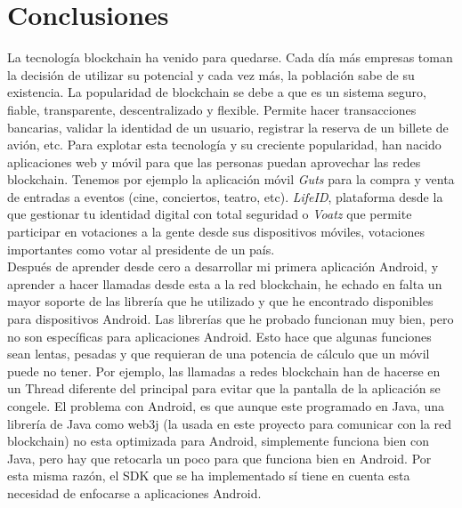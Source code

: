 \chapter{Conclusiones}
\label{cap:Conclusiones}

La tecnología blockchain ha venido para quedarse. Cada día más empresas toman la decisión de utilizar su potencial y cada vez más, la población sabe de su existencia. La popularidad de blockchain se debe a que es un sistema seguro, fiable, transparente, descentralizado y flexible. Permite hacer transacciones bancarias, validar la identidad de un usuario, registrar la reserva de un billete de avión, etc. Para explotar esta tecnología y su creciente popularidad, han nacido aplicaciones web y móvil para que las personas puedan aprovechar las redes blockchain. Tenemos por ejemplo la aplicación móvil \emph{Guts} para la compra y venta de entradas a eventos (cine, conciertos, teatro, etc). \emph{LifeID}, plataforma desde la que gestionar tu identidad digital con total seguridad o \emph{Voatz} que permite participar en votaciones a la gente desde sus dispositivos móviles, votaciones importantes como votar al presidente de un país. \\

Después de aprender desde cero a desarrollar mi primera aplicación Android, y aprender a hacer llamadas desde esta a la red blockchain, he echado en falta un mayor soporte de las librería que he utilizado y que he encontrado disponibles para dispositivos Android. Las librerías que he probado funcionan muy bien, pero no son específicas para aplicaciones Android. Esto hace que algunas funciones sean lentas, pesadas y que requieran de una potencia de cálculo que un móvil puede no tener. Por ejemplo, las llamadas a redes blockchain han de hacerse en un Thread diferente del principal para evitar que la pantalla de la aplicación se congele. El problema con Android, es que aunque este programado en Java, una librería de Java como web3j (la usada en este proyecto para comunicar con la red blockchain) no esta optimizada para Android, simplemente funciona bien con Java, pero hay que retocarla un poco para que funciona bien en Android. Por esta misma razón, el SDK que se ha implementado sí tiene en cuenta esta necesidad de enfocarse a aplicaciones Android. \\

